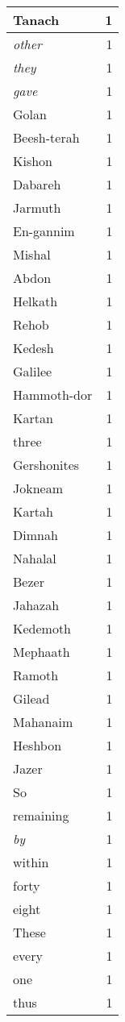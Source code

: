 \begin{center}
\begin{longtable}{l|r}
Tanach & 1\\ \hline 
\emph{other} & 1\\ \hline 
\emph{they} & 1\\ \hline 
\emph{gave} & 1\\ \hline 
Golan & 1\\ \hline 
Beesh-terah & 1\\ \hline 
Kishon & 1\\ \hline 
Dabareh & 1\\ \hline 
Jarmuth & 1\\ \hline 
En-gannim & 1\\ \hline 
Mishal & 1\\ \hline 
Abdon & 1\\ \hline 
Helkath & 1\\ \hline 
Rehob & 1\\ \hline 
Kedesh & 1\\ \hline 
Galilee & 1\\ \hline 
Hammoth-dor & 1\\ \hline 
Kartan & 1\\ \hline 
three & 1\\ \hline 
Gershonites & 1\\ \hline 
Jokneam & 1\\ \hline 
Kartah & 1\\ \hline 
Dimnah & 1\\ \hline 
Nahalal & 1\\ \hline 
Bezer & 1\\ \hline 
Jahazah & 1\\ \hline 
Kedemoth & 1\\ \hline 
Mephaath & 1\\ \hline 
Ramoth & 1\\ \hline 
Gilead & 1\\ \hline 
Mahanaim & 1\\ \hline 
Heshbon & 1\\ \hline 
Jazer & 1\\ \hline 
So & 1\\ \hline 
remaining & 1\\ \hline 
\emph{by} & 1\\ \hline 
within & 1\\ \hline 
forty & 1\\ \hline 
eight & 1\\ \hline 
These & 1\\ \hline 
every & 1\\ \hline 
one & 1\\ \hline 
thus & 1\\ \hline 

\end{longtable}
\end{center}
